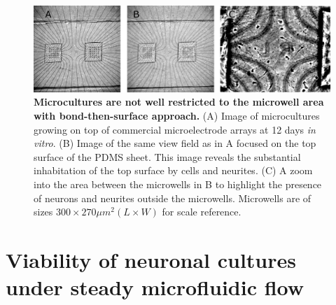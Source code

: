         \begin{figure}[h]
            \centering
            \includegraphics[width=15cm]{chapter4/figures/microWellsIsolation/isolationIssue.jpg}
            \caption[Demonstration of the microculture isolation issue with the bond-then-surface approach]{\textbf{Microcultures are not well restricted to the microwell area with bond-then-surface approach.} (A) Image of microcultures growing on top of commercial microelectrode arrays at 12 days \textit{in vitro}. (B) Image of the same view field as in A focused on the top surface of the PDMS sheet. This image reveals the substantial inhabitation of the top surface by cells and neurites. (C) A zoom into the area between the microwells in B to highlight the presence of neurons and neurites outside the microwells. Microwells are of sizes \(300\times270 \mu m^2 (L\times W)\) for scale reference.}
            \label{fig:devices:mwIso}
        \end{figure}



\section{Viability of neuronal cultures under steady microfluidic flow}
\label{sec:devices:viability}


